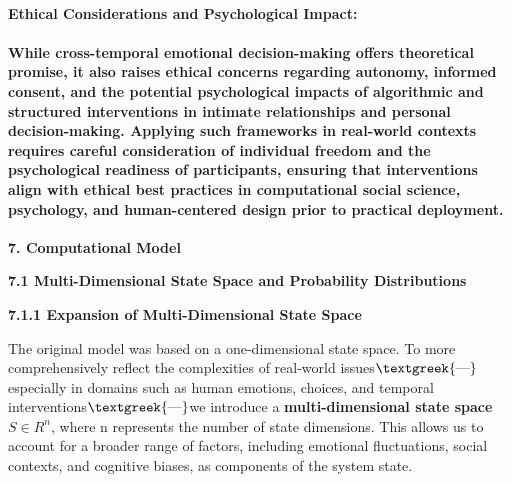 \documentclass[a4paper]{article}
\begin{document}
\paragraph[Ethical Considerations and Psychological Impact:]{\textbf{Ethical Considerations and Psychological Impact:}}
\paragraph[While cross{}-temporal emotional decision{}-making offers theoretical promise, it also raises ethical
concerns regarding autonomy, informed consent, and the potential psychological impacts of algorithmic and structured
interventions in intimate relationships and personal decision{}-making. Applying such frameworks in real{}-world
contexts requires careful consideration of individual freedom and the psychological readiness of participants, ensuring
that interventions align with ethical best practices in computational social science, psychology, and human{}-centered
design prior to practical deployment.]{While cross-temporal emotional decision-making offers theoretical promise, it
also raises \textbf{ethical concerns} regarding \textbf{autonomy, informed consent,} and the potential
\textbf{psychological impacts} of \textbf{algorithmic and structured interventions} in \textbf{intimate relationships}
and \textbf{personal decision-making.} Applying such frameworks in \textbf{real-world contexts} requires careful
consideration of \textbf{individual freedom} and the \textbf{psychological readiness} of participants, ensuring that
interventions align with \textbf{ethical best practices} in \textbf{computational social science, psychology,} and
\textbf{human-centered design} prior to \textbf{practical deployment.}}
{\centering\color[HTML]{595959}
\textbf{7. Computational Model}
\par}

\textbf{7.1 Multi-Dimensional State Space and Probability Distributions}

\textbf{7.1.1 Expansion of Multi-Dimensional State Space}

The original model was based on a one-dimensional state space. To more comprehensively reflect the complexities of
real-world issues$\text{\textgreek{—}}$especially in domains such as human emotions, choices, and temporal
interventions$\text{\textgreek{—}}$we introduce a \textbf{multi-dimensional state space}\textbf{\textit{ }}
$S{\in}R^n$, where n represents the number of state dimensions. This allows us to account for a broader range of
factors, including emotional fluctuations, social contexts, and cognitive biases, as components of the system state.
\end{document}
